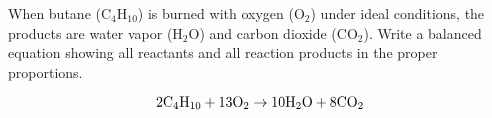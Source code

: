 

When butane (C$_{4}$H$_{10}$) is burned with oxygen (O$_{2}$) under ideal conditions, the products are water vapor (H$_{2}$O) and carbon dioxide (CO$_{2}$).  Write a balanced equation showing all reactants and all reaction products in the proper proportions.







$$\hbox{2C}_4\hbox{H}_{10} + \hbox{13O}_2 \to \hbox{10H}_2\hbox{O} + \hbox{8CO}_2$$












